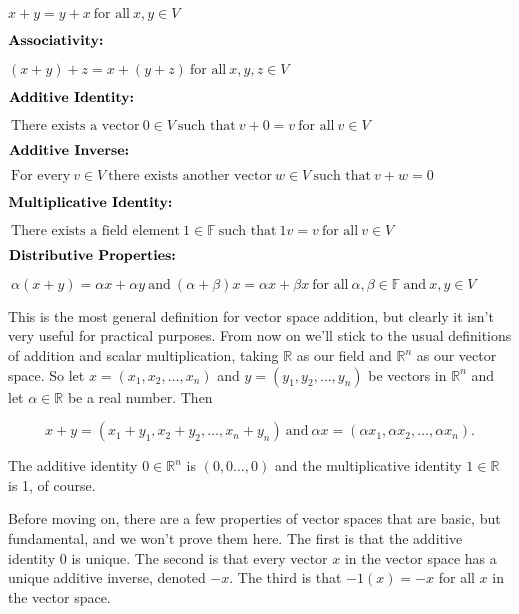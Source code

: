 \documentclass[12pt]{article}
\begin{document}
$ x + y = y + x \: \textrm{for all} \: x, y \in V$

\vskip 2mm

$\textbf{\textrm{Associativity:}}$ 

$ (x + y) + z = x + (y + z) \: \textrm{for all} \: x, y, z \in V$

\vskip 2mm

$\textbf{\textrm{Additive Identity:}} $

$\: \textrm{There exists a vector} \: 0 \in V \: \textrm{such that} \: v + 0 = v \: \textrm{for all} \: v \in V$

\vskip 2mm

$\textbf{\textrm{Additive Inverse:}} $

$\: \textrm{For every} \: v \in V \: \textrm{there exists another vector} \: w \in V \: \textrm{such that} \: v + w = 0$

\vskip 2mm

$\textbf{\textrm{Multiplicative Identity:}} $

$\: \textrm{There exists a field element} \: 1 \in \mathbb{F} \: \textrm{such that} \: 1v = v \: \textrm{for all} \: v \in V$

\vskip 2mm

$\textbf{\textrm{Distributive Properties:}} $

$\: \alpha(x + y) = \alpha x + \alpha y \: \textrm{and} \: (\alpha + \beta)x = \alpha x + \beta x \: \textrm{for all} \: \alpha, \beta \in \mathbb{F} \: \textrm{and} \: x, y \in V$


\vskip 5mm
This is the most general definition for vector space addition, but clearly it isn't very useful for practical purposes. From now on we'll stick to the usual definitions of addition and scalar multiplication, taking $\mathbb{R}$ as our field and $\mathbb{R}^n$ as our vector space. So let $x = (x_1, x_2, \ldots, x_n)$ and $y = (y_1, y_2, \ldots, y_n)$ be vectors in $\mathbb{R}^n$ and let $\alpha \in \mathbb{R}$ be a real number. Then

$$x + y = (x_1 + y_1, x_2 + y_2, \ldots, x_n + y_n) \: \textrm{and} \: \alpha x = (\alpha x_1, \alpha x_2, \ldots, \alpha x_n).$$

The additive identity $0 \in \mathbb{R}^n$ is $(0, 0 \ldots, 0)$ and the multiplicative identity $1 \in \mathbb{R}$ is 1, of course. 

Before moving on, there are a few properties of vector spaces that are basic, but fundamental, and we won't prove them here. The first is that the additive identity $0$ is unique. The second is that every vector $x$ in the vector space has a unique additive inverse, denoted $-x$. The third is that $-1(x) = -x$ for all $x$ in the vector space.
\end{document}
